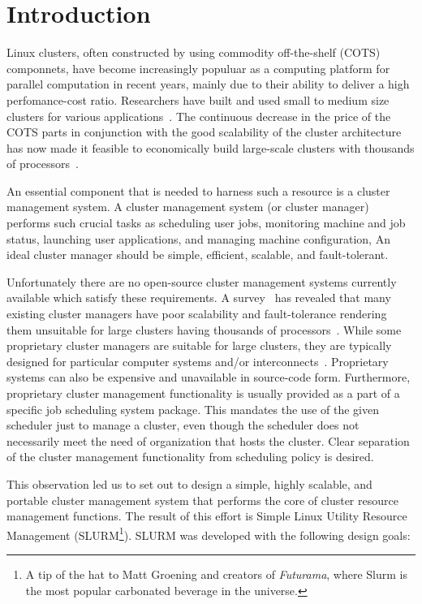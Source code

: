\section{Introduction}
Linux clusters, often constructed by using commodity off-the-shelf (COTS) componnets,
have become increasingly populuar as a computing platform for parallel computation
in recent years, mainly due to their ability to deliver a high perfomance-cost ratio.
Researchers have built and used small to medium size clusters for various
applications~\cite{BeowulfWeb,LokiWeb}.
The continuous decrease in the price of the COTS parts in conjunction with
the good scalability of the cluster architecture has now made it feasible to economically
build large-scale clusters with thousands of processors~\cite{MCRWeb,PCRWeb}.

An essential component that is needed to harness such a resource is a 
cluster management system.
A cluster management system (or cluster manager) performs such crucial tasks as
scheduling user jobs, monitoring machine and job status, launching user applications, and
managing machine configuration,
An ideal cluster manager should be simple, efficient, scalable, and fault-tolerant.

Unfortunately there are no open-source cluster management systems currently available 
which satisfy these requirements.
A survey~\cite{Jette02} has revealed that many existing cluster managers have poor scalability and fault-tolerance rendering them unsuitable for large clusters having 
thousands of processors~\cite{LoadLevelerWeb,LoadLevelerManual}.
While some proprietary cluster managers are suitable for large clusters, 
they are typically designed for particular computer systems and/or 
interconnects~\cite{RMS,LoadLevelerWeb,LoadLevelerManual}. 
Proprietary systems can also be expensive and unavailable in source-code form. 
Furthermore, proprietary cluster management functionality is usually provided as a 
part of a specific job scheduling system package. 
This mandates the use of the given scheduler just to manage a cluster, 
even though the scheduler does not necessarily meet the need of organization that hosts the cluster.
Clear separation of the cluster management functionality from scheduling policy is desired.

This observation led us to set out to design a simple, highly scalable, and 
portable cluster management system that performs the core of cluster resource management functions. 
The result of this effort is Simple Linux Utility Resource Management 
(SLURM\footnote{A tip of the hat to Matt Groening and creators of {\em Futurama},
where Slurm is the most popular carbonated beverage in the universe.}). 
SLURM was developed with the following design goals:

